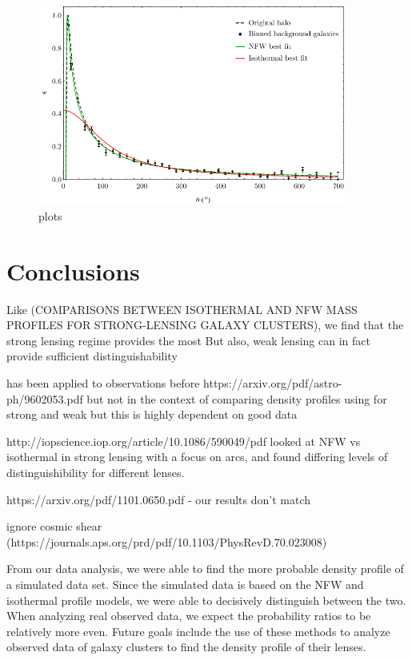 \documentclass[10pt]{article}
\begin{document}
\begin{figure}
    \centering
    \includegraphics[width=0.9\textwidth]{comparison.pdf}
    \caption{plots}
    \label{}
\end{figure}

\section{Conclusions}

Like (COMPARISONS BETWEEN ISOTHERMAL AND NFW MASS PROFILES
FOR STRONG-LENSING GALAXY CLUSTERS), we find that the strong lensing regime provides the most
But also, weak lensing can in fact provide sufficient distinguishability

has been applied to observations before
https://arxiv.org/pdf/astro-ph/9602053.pdf
but not in the context of comparing density profiles using for strong and weak
but this is highly dependent on good data

http://iopscience.iop.org/article/10.1086/590049/pdf looked at NFW vs isothermal in strong lensing with a focus on arcs, and found differing levels of distinguishibility for different lenses.

https://arxiv.org/pdf/1101.0650.pdf - our results don't match

ignore cosmic shear (https://journals.aps.org/prd/pdf/10.1103/PhysRevD.70.023008)

From our data analysis, we were able to find the more probable density profile of a simulated data set.
Since the simulated data is based on the NFW and isothermal profile models, we were able to decisively distinguish between the two.
When analyzing real observed data, we expect the probability ratios to be relatively more even.
Future goals include the use of these methods to analyze observed data of galaxy clusters to find the density profile of their lenses.





\end{document}
